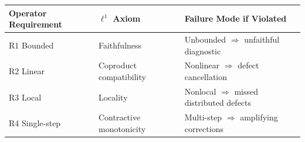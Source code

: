 \documentclass[
]{article}
\begin{document}
\begin{longtable}[]{@{}lll@{}}
\toprule
\begin{minipage}[b]{0.32\columnwidth}\raggedright
Operator Requirement\strut
\end{minipage} & \begin{minipage}[b]{0.23\columnwidth}\raggedright
\(\ell^1\) Axiom\strut
\end{minipage} & \begin{minipage}[b]{0.37\columnwidth}\raggedright
Failure Mode if Violated\strut
\end{minipage}\tabularnewline
\midrule
\endhead
\begin{minipage}[t]{0.32\columnwidth}\raggedright
R1 Bounded\strut
\end{minipage} & \begin{minipage}[t]{0.23\columnwidth}\raggedright
Faithfulness\strut
\end{minipage} & \begin{minipage}[t]{0.37\columnwidth}\raggedright
Unbounded \(\Rightarrow\) unfaithful diagnostic\strut
\end{minipage}\tabularnewline
\begin{minipage}[t]{0.32\columnwidth}\raggedright
R2 Linear\strut
\end{minipage} & \begin{minipage}[t]{0.23\columnwidth}\raggedright
Coproduct compatibility\strut
\end{minipage} & \begin{minipage}[t]{0.37\columnwidth}\raggedright
Nonlinear \(\Rightarrow\) defect cancellation\strut
\end{minipage}\tabularnewline
\begin{minipage}[t]{0.32\columnwidth}\raggedright
R3 Local\strut
\end{minipage} & \begin{minipage}[t]{0.23\columnwidth}\raggedright
Locality\strut
\end{minipage} & \begin{minipage}[t]{0.37\columnwidth}\raggedright
Nonlocal \(\Rightarrow\) missed distributed defects\strut
\end{minipage}\tabularnewline
\begin{minipage}[t]{0.32\columnwidth}\raggedright
R4 Single-step\strut
\end{minipage} & \begin{minipage}[t]{0.23\columnwidth}\raggedright
Contractive monotonicity\strut
\end{minipage} & \begin{minipage}[t]{0.37\columnwidth}\raggedright
Multi-step \(\Rightarrow\) amplifying corrections\strut
\end{minipage}\tabularnewline
\bottomrule
\end{longtable}
\end{document}
